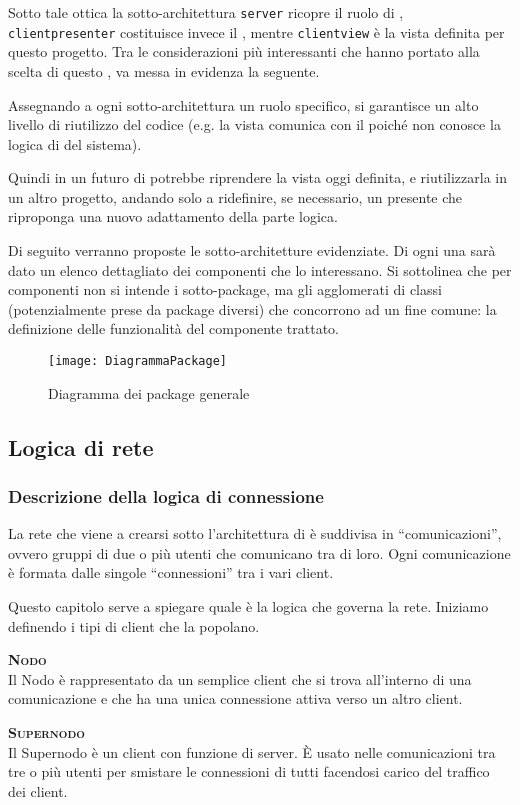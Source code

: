 Sotto tale ottica la sotto-architettura \texttt{server} ricopre il ruolo di , \texttt{clientpresenter} costituisce invece il , mentre \texttt{clientview} è la vista definita per questo progetto. Tra le considerazioni più interessanti che hanno portato alla scelta di questo , va messa in evidenza la seguente.

Assegnando a ogni sotto-architettura un ruolo specifico, si garantisce un alto livello di riutilizzo del codice (e.g. la vista comunica con il  poiché non conosce la logica di  del sistema).

Quindi in un futuro di potrebbe riprendere la vista oggi definita, e riutilizzarla in un altro progetto, andando solo a ridefinire, se necessario, un presente che riproponga una nuovo adattamento della parte logica.

Di seguito verranno proposte le sotto-architetture evidenziate. Di ogni una sarà dato un elenco dettagliato dei componenti che lo interessano. Si sottolinea che per componenti non si intende i sotto-package, ma gli agglomerati di classi (potenzialmente prese da package diversi) che concorrono ad un fine comune: la definizione delle funzionalità del componente trattato.

\begin{figure}[H]
\centering
  \texttt{[image: DiagrammaPackage]}
  \caption{Diagramma dei package generale}\label{fig:packagegenerale}
\end{figure}

\clearpage

\subsection{Logica di rete}

\subsubsection{Descrizione della logica di connessione}
La rete che viene a crearsi sotto l'architettura di \caName{} è suddivisa in ``comunicazioni'', ovvero gruppi di due o più utenti che comunicano tra di loro. Ogni comunicazione è formata dalle singole ``connessioni'' tra i vari client.

Questo capitolo serve a spiegare quale è la logica che governa la rete. Iniziamo definendo i tipi di client che la popolano.
\begin{description}
	\item{\scshape\bfseries Nodo}\\
	Il Nodo è rappresentato da un semplice client che si trova all'interno di una comunicazione e che ha una unica connessione attiva verso un altro client.
	\item{\scshape\bfseries Supernodo}\\
	Il Supernodo è un client con funzione di server. È usato nelle comunicazioni tra tre o più utenti per smistare le connessioni di tutti facendosi carico del traffico dei client.
\end{description}

